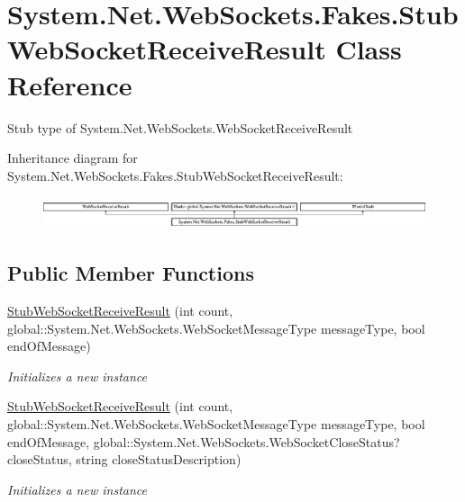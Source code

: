 \hypertarget{class_system_1_1_net_1_1_web_sockets_1_1_fakes_1_1_stub_web_socket_receive_result}{\section{System.\-Net.\-Web\-Sockets.\-Fakes.\-Stub\-Web\-Socket\-Receive\-Result Class Reference}
\label{class_system_1_1_net_1_1_web_sockets_1_1_fakes_1_1_stub_web_socket_receive_result}
}


Stub type of System.\-Net.\-Web\-Sockets.\-Web\-Socket\-Receive\-Result 


Inheritance diagram for System.\-Net.\-Web\-Sockets.\-Fakes.\-Stub\-Web\-Socket\-Receive\-Result\-:\begin{figure}[H]
\begin{center}
\leavevmode
\includegraphics[height=0.949958cm]{class_system_1_1_net_1_1_web_sockets_1_1_fakes_1_1_stub_web_socket_receive_result}
\end{center}
\end{figure}
\subsection*{Public Member Functions}
\begin{DoxyCompactItemize}
\item 
\hyperlink{class_system_1_1_net_1_1_web_sockets_1_1_fakes_1_1_stub_web_socket_receive_result_a218be7856c7d9ed94855ccfc6638a447}{Stub\-Web\-Socket\-Receive\-Result} (int count, global\-::\-System.\-Net.\-Web\-Sockets.\-Web\-Socket\-Message\-Type message\-Type, bool end\-Of\-Message)
\begin{DoxyCompactList}\small\item\em Initializes a new instance\end{DoxyCompactList}\item 
\hyperlink{class_system_1_1_net_1_1_web_sockets_1_1_fakes_1_1_stub_web_socket_receive_result_a6f44af14e109f471d3b5f6820f0c7d5d}{Stub\-Web\-Socket\-Receive\-Result} (int count, global\-::\-System.\-Net.\-Web\-Sockets.\-Web\-Socket\-Message\-Type message\-Type, bool end\-Of\-Message, global\-::\-System.\-Net.\-Web\-Sockets.\-Web\-Socket\-Close\-Status?close\-Status, string close\-Status\-Description)
\begin{DoxyCompactList}\small\item\em Initializes a new instance\end{DoxyCompactList}\end{DoxyCompactItemize}
